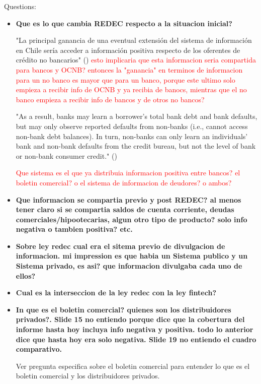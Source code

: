 \documentclass[12pt]{article}
\theoremstyle{plain}
\theoremstyle{plain}
\theoremstyle{definition}  %
\theoremstyle{remark}  %
\begin{document}
Questions: 

\begin{itemize}
 
   
    \item \textbf{Que es lo que cambia REDEC respecto a la situacion inicial? }
    
    "La principal ganancia de una eventual extensión del sistema de información en Chile sería acceder a información positiva respecto de los oferentes de crédito no  bancarios" (\cite{berstein_desarrollo_2020}) \textcolor{red}{esto implicaria que esta informacion seria compartida para bancos y OCNB? entonces la "ganancia" en terminos de informacion para un no banco es mayor que para un banco, porque este ultimo solo empieza a recibir info de OCNB y ya recibia de banocs, mientras que el no banco empieza a recibir info de bancos y de otros no bancos?} 

    "As a result,  banks may learn a borrower’s total bank debt and bank defaults, but may only observe  reported defaults from non-banks (i.e., cannot access non-bank debt balances). In turn,  non-banks can only learn an individuals’ bank and non-bank defaults from the credit  bureau, but not the level of bank or non-bank consumer credit." (\cite{liberman_equilibrium_2018})

    \textcolor{red}{Que sistema es el que ya distribuia informacion positiva entre bancos? el boletin comercial? o el sistema de informacion de deudores? o ambos? }

   
    \item \textbf{Que informacion se compartia previo y post REDEC? al menos tener claro si se compartia saldos de cuenta corriente, deudas comerciales/hipootecarias, algun otro tipo de producto? solo info negativa o tambien positiva? etc. }

   


    \item  \textbf{ Sobre ley redec cual era el sitema previo de divulgacion de informacion. mi impression es que habia un Sistema publico y un Sistema privado, es asi? que informacion divulgaba cada uno de ellos? }

    \item \textbf{Cual es la interseccion de la ley redec con la ley fintech? }
    
    \item \textbf{ In \textcite{berstein_proyecto_2022} que es el boletin comercial? quienes son los distribuidores privados?. Slide 15 no entiendo porque dice que la cobertura del informe hasta hoy incluya info negativa y positiva. todo lo anterior dice que hasta hoy era solo negativa. Slide 19 no entiendo el cuadro comparativo.}
    
    Ver pregunta especifica sobre el boletin comercial para  entender lo que es el boletin comercial y los distribuidores privados. 
 

\end{itemize}
 
\end{document}
